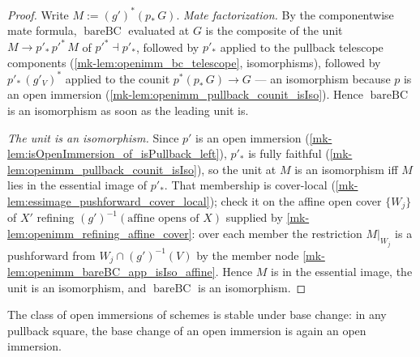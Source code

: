 \begin{proof}
  \leanok{}
  Write \(M := (g')^*(p_*\,G)\).  \emph{Mate factorization.}  By the componentwise mate formula,
  \(\operatorname{bareBC}\) evaluated at \(G\) is the composite of the unit
  \(M \to p'_*\,p'^*\,M\) of \(p'^* \dashv p'_*\), followed by \(p'_*\) applied to the pullback
  telescope components (\ref{mk-lem:openimm_bc_telescope}, isomorphisms), followed by
  \(p'_*\,(g'_V)^*\) applied to the counit \(p^*(p_*\,G) \to G\) --- an isomorphism because
  \(p\) is an open immersion (\ref{mk-lem:openimm_pullback_counit_isIso}).  Hence
  \(\operatorname{bareBC}\) is an isomorphism as soon as the leading unit is.

  \emph{The unit is an isomorphism.}  Since \(p'\) is an open immersion
  (\ref{mk-lem:isOpenImmersion_of_isPullback_left}), \(p'_*\) is fully faithful
  (\ref{mk-lem:openimm_pullback_counit_isIso}), so the unit at \(M\) is an isomorphism iff \(M\)
  lies in the essential image of \(p'_*\).  That membership is cover-local
  (\ref{mk-lem:essimage_pushforward_cover_local}); check it on the affine open cover \(\{W_j\}\) of
  \(X'\) refining \((g')^{-1}(\text{affine opens of } X)\) supplied by
  \ref{mk-lem:openimm_refining_affine_cover}: over each member the restriction \(M|_{W_j}\) is a
  pushforward from \(W_j \cap (g')^{-1}(V)\) by the member node
  \ref{mk-lem:openimm_bareBC_app_isIso_affine}.  Hence \(M\) is in the essential image, the unit is
  an isomorphism, and \(\operatorname{bareBC}\) is an isomorphism.
\end{proof}

\begin{lemma}
  \label{mk-lem:isOpenImmersion_stableUnderBaseChange_mathlib}
  \mathlibok

  The class of open immersions of schemes is stable under base change: in any pullback square,
  the base change of an open immersion is again an open immersion.
\end{lemma}

